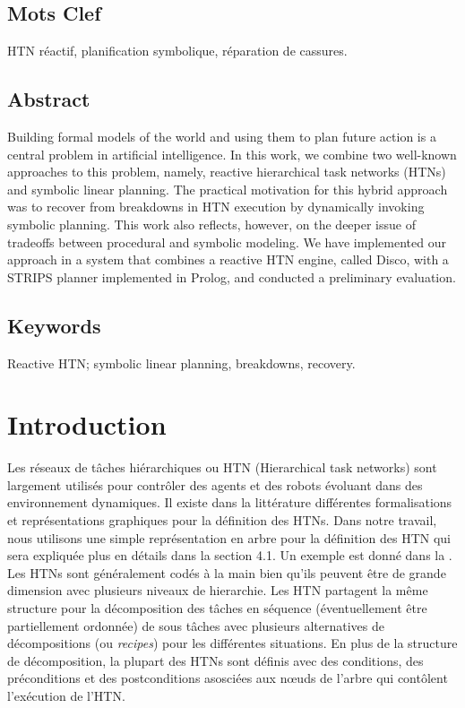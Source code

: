 \documentclass[a4paper,twoside,french]{article}
\begin{document}
				\subsection*{Mots Clef}
				HTN réactif, planification symbolique, réparation de cassures.
				
				\subsection*{Abstract}
				Building formal models of the world and using them to plan future
				action is a central problem in artificial intelligence.  In this
				work, we combine two well-known approaches to this problem, namely,
				reactive hierarchical task networks (HTNs) and symbolic linear
				planning.  The practical motivation for this hybrid approach was to
				recover from breakdowns in HTN execution by dynamically invoking
				symbolic planning.  This work also reflects, however, on the deeper
				issue of tradeoffs between procedural and symbolic modeling.  We
				have implemented our approach in a system that combines a reactive
				HTN engine, called Disco, with a STRIPS planner implemented in
				Prolog, and conducted a preliminary evaluation.
				\subsection*{Keywords}
				Reactive HTN; symbolic linear planning, breakdowns, recovery.
				
				
				\section{Introduction}
				Les r\'eseaux de t\^aches hi\'erarchiques ou HTN \cite{erol1994htn} (Hierarchical task networks) sont largement utilis\'es pour contr\^oler des agents et des robots \'evoluant dans des environnement dynamiques. Il existe dans la litt\'erature diff\'erentes formalisations et  repr\'esentations graphiques pour la d\'efinition des HTNs. Dans notre travail, nous utilisons une simple repr\'esentation en arbre pour la  d\'efinition des HTN qui sera expliqu\'ee plus en d\'etails dans la section 4.1. Un exemple est donn\'e dans la .
				Les HTNs sont g\'en\'eralement cod\'es \`a la main bien qu'ils peuvent être de grande dimension avec plusieurs niveaux de hierarchie. Les HTN partagent la m\^eme structure pour la d\'ecomposition des t\^aches en s\'equence (éventuellement \^etre partiellement ordonn\'ee) de sous t\^aches avec plusieurs alternatives de d\'ecompositions (ou \emph{recipes}) pour les diff\'erentes situations. En plus de la structure de d\'ecomposition, la plupart des HTNs sont d\'efinis avec des conditions, des pr\'econditions et des postconditions asosci\'ees aux n\oe uds de l'arbre qui  cont\^olent l'ex\'ecution de l'HTN.
								
\end{document}
